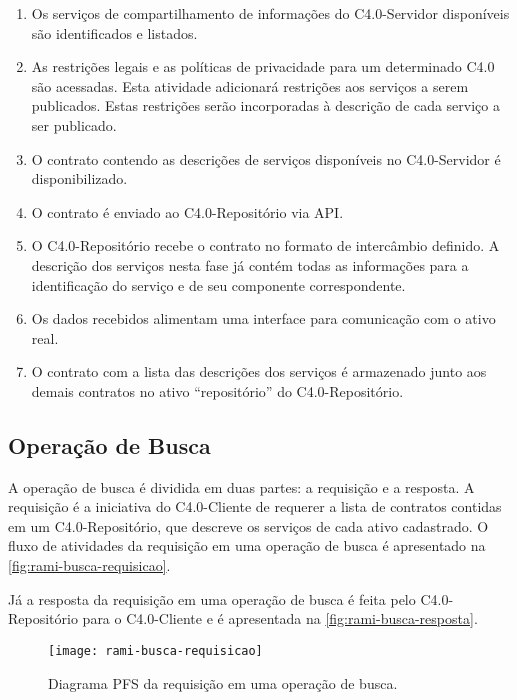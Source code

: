 \begin{enumerate}

	\item Os serviços de compartilhamento de informações do C4.0-Servidor disponíveis são identificados e listados.

	\item As restrições legais e as políticas de privacidade para um determinado C4.0 são acessadas. Esta atividade adicionará restrições aos serviços a serem publicados. Estas restrições serão incorporadas à descrição de cada serviço a ser publicado.

	\item O contrato contendo as descrições de serviços disponíveis no C4.0-Servidor é disponibilizado.

	\item O contrato é enviado ao C4.0-Repositório via API.

	\item O C4.0-Repositório recebe o contrato no formato de intercâmbio definido. A descrição dos serviços nesta fase já contém todas as informações para a identificação do serviço e de seu componente correspondente.

	\item Os dados recebidos alimentam uma interface para comunicação com o ativo real.

	\item O contrato com a lista das descrições dos serviços é armazenado junto aos demais contratos no ativo ``repositório'' do C4.0-Repositório.

\end{enumerate}

\subsection{Operação de Busca}

A operação de busca é dividida em duas partes: a requisição e a resposta. A requisição é a iniciativa do C4.0-Cliente de requerer a lista de contratos contidas em um C4.0-Repositório, que descreve os serviços de cada ativo cadastrado. O fluxo de atividades da requisição em uma operação de busca é apresentado na \autoref{fig:rami-busca-requisicao}.

Já a resposta da requisição em uma operação de busca é feita pelo C4.0-Repositório para o C4.0-Cliente e é apresentada na \autoref{fig:rami-busca-resposta}.

\begin{figure}[htb]
	\centering
	\texttt{[image: rami-busca-requisicao]}
	\caption{Diagrama PFS da requisição em uma operação de busca.}
	\label{fig:rami-busca-requisicao}
\end{figure}

